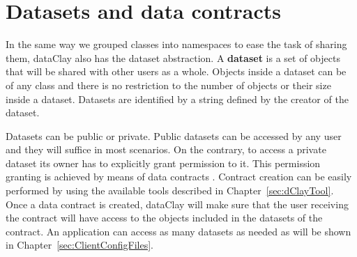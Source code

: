 % 
% 
% 
% 

\section{Datasets and data contracts}

In the same way we grouped classes into namespaces to ease the task of sharing them, dataClay also has the dataset abstraction. A {\bf dataset} is a set of objects that will be shared with other users as a whole. Objects inside a dataset can be of any class and there is no restriction to the number of objects or their size inside a dataset. Datasets are identified by a string defined by the creator of the dataset.

Datasets can be public or private. Public datasets can be accessed by any user and they will suffice in most scenarios. On the contrary, to access a private dataset its owner has to explicitly grant permission to it. This permission granting is achieved by means of data contracts . Contract creation can be easily performed by using the available tools described in Chapter~\ref{sec:dClayTool}. Once a data contract is created, dataClay will make sure that the user receiving the contract will have access to the objects included in the datasets of the contract. An application can access as many datasets as needed as will be shown in Chapter~\ref{sec:ClientConfigFiles}.

